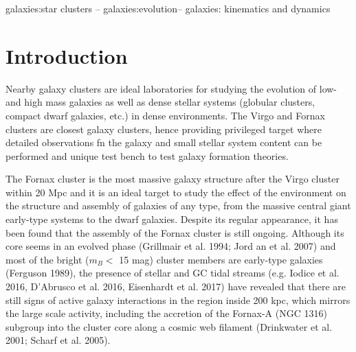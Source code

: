 \documentclass[useAMS,usenatbib]{mn2e}
\begin{document}
\begin{keywords}
galaxies:star clusters -- galaxies:evolution-- galaxies: kinematics and dynamics
\end{keywords}

\section{Introduction}

Nearby galaxy clusters are ideal laboratories for studying the evolution of 
low- and high mass galaxies as well as dense stellar systems (globular 
clusters, compact dwarf galaxies, etc.) in dense environments. The Virgo and 
Fornax clusters are closest galaxy clusters, hence providing privileged target 
where detailed observations fn the galaxy and small stellar system content can 
be performed and unique test bench to test galaxy formation theories. 

The Fornax cluster is the most massive galaxy structure after the Virgo cluster 
within 20 Mpc and it is an ideal target to study the effect of the environment 
on the structure and assembly of galaxies of any type, from the massive central 
giant early-type systems to the dwarf galaxies. Despite its regular appearance, 
it has been found that the assembly of the Fornax cluster is still ongoing. 
Although its core seems in an evolved phase (Grillmair et al. 1994; Jord an et 
al. 2007) and most of the bright ($m_B < $  15 mag) cluster members are 
early-type galaxies (Ferguson 1989), the presence of stellar and GC tidal 
streams (e.g. Iodice et al. 2016, D’Abrusco et al. 2016, Eisenhardt et al. 
2017) have revealed that there are still signs of active galaxy interactions in 
the region inside 200 kpc, which mirrors the large scale activity, including 
the accretion of the Fornax-A (NGC 1316) subgroup into the cluster core along a 
cosmic web filament (Drinkwater et al. 2001; Scharf et al. 2005).
\end{document}
